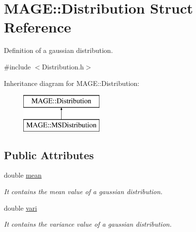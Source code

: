 \hypertarget{struct_m_a_g_e_1_1_distribution}{\section{M\-A\-G\-E\-:\-:Distribution Struct Reference}
\label{struct_m_a_g_e_1_1_distribution}
}


Definition of a gaussian distribution.  




{\ttfamily \#include $<$Distribution.\-h$>$}

Inheritance diagram for M\-A\-G\-E\-:\-:Distribution\-:\begin{figure}[H]
\begin{center}
\leavevmode
\includegraphics[height=2.000000cm]{struct_m_a_g_e_1_1_distribution}
\end{center}
\end{figure}
\subsection*{Public Attributes}
\begin{DoxyCompactItemize}
\item 
\hypertarget{struct_m_a_g_e_1_1_distribution_a604ebb36706e149529946d2028a178eb}{double \hyperlink{struct_m_a_g_e_1_1_distribution_a604ebb36706e149529946d2028a178eb}{mean}}\label{struct_m_a_g_e_1_1_distribution_a604ebb36706e149529946d2028a178eb}

\begin{DoxyCompactList}\small\item\em It contains the mean value of a gaussian distribution. \end{DoxyCompactList}\item 
\hypertarget{struct_m_a_g_e_1_1_distribution_a9e2f2aa03bb780e60bb402d6eb5c941d}{double \hyperlink{struct_m_a_g_e_1_1_distribution_a9e2f2aa03bb780e60bb402d6eb5c941d}{vari}}\label{struct_m_a_g_e_1_1_distribution_a9e2f2aa03bb780e60bb402d6eb5c941d}

\begin{DoxyCompactList}\small\item\em It contains the variance value of a gaussian distribution. \end{DoxyCompactList}\end{DoxyCompactItemize}


